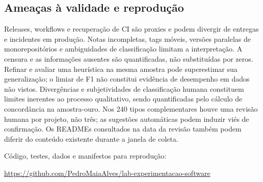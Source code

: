 \subsection{Ameaças à validade e reprodução}

Releases, workflows e recuperação de CI são proxies e podem divergir de entregas
e incidentes em produção. Notas incompletas, tags móveis, versões paralelas de
monorepositórios e ambiguidades de classificação limitam a interpretação.
A censura e as informações ausentes são quantificadas, não substituídas por zeros.
Refinar e avaliar uma heurística na mesma amostra pode superestimar sua generalização;
o limiar de F1 não constitui evidência de desempenho em dados não vistos. Divergências
e subjetividades de classificação humana constituem limites inerentes ao processo qualitativo,
sendo quantificadas pelo cálculo de concordância na amostra-ouro. Nos 240 tipos
complementares houve uma revisão humana por projeto, não três; as sugestões
automáticas podem induzir viés de confirmação. Os READMEs consultados na data da
revisão também podem diferir do conteúdo existente durante a janela de coleta.

\noindent Código, testes, dados e manifestos para reprodução:
\begin{flushleft}
\footnotesize\url{https://github.com/PedroMaiaAlves/lab-experimentacao-software}
\end{flushleft}
